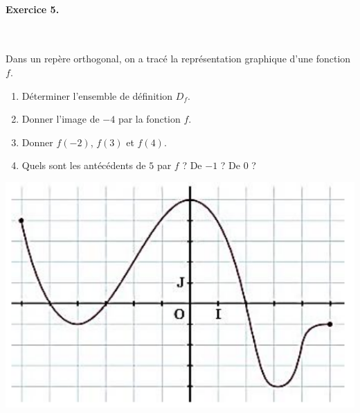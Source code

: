 \documentclass[11pt]{article}
\begin{document}
\paragraph{Exercice 5.}~\\
\begin{minipage}{.6\textwidth}
Dans un repère orthogonal, on a tracé la représentation
graphique d'une fonction $f$.
  \begin{enumerate}
    \item Déterminer l'ensemble de définition $D_f$.
    \item Donner l'image de $-4$ par la fonction $f$.
    \item Donner $f(-2)$, $f(3)$ et $f(4)$.
    \item Quels sont les antécédents de $5$ par $f$ ? De $-1$ ? De $0$ ?
  \end{enumerate}
\end{minipage}
\begin{minipage}{.4\textwidth}
  \begin{center}
    \includegraphics[scale=.3]{graph.png}
  \end{center}
\end{minipage}
\end{document}
